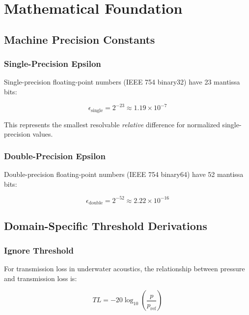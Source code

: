 \section{Mathematical Foundation}
\label{sec:math}

\subsection{Machine Precision Constants}

\subsubsection{Single-Precision Epsilon}

Single-precision floating-point numbers (IEEE 754 binary32) have 23 mantissa bits:

\begin{equation}
    \epsilon_{\text{single}} = 2^{-23} \approx 1.19 \times 10^{-7}
\end{equation}

This represents the smallest resolvable \emph{relative} difference for normalized single-precision values.

\subsubsection{Double-Precision Epsilon}

Double-precision floating-point numbers (IEEE 754 binary64) have 52 mantissa bits:

\begin{equation}
    \epsilon_{\text{double}} = 2^{-52} \approx 2.22 \times 10^{-16}
\end{equation}

\subsection{Domain-Specific Threshold Derivations}

\subsubsection{Ignore Threshold}

For transmission loss in underwater acoustics, the relationship between pressure and transmission loss is:

\begin{equation}
    TL = -20 \log_{10}\left(\frac{p}{p_{\text{ref}}}\right)
\end{equation}

